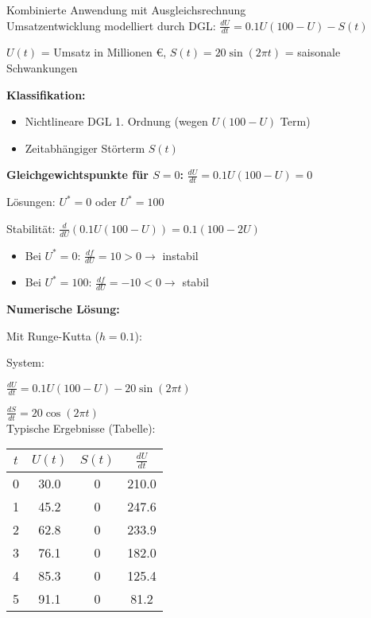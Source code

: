 \begin{example2}{Kombinierte Anwendung mit Ausgleichsrechnung}\\
Umsatzentwicklung modelliert durch DGL:
$\frac{dU}{dt} = 0.1U(100 - U) - S(t)$

$U(t)$ = Umsatz in Millionen €, $S(t) = 20\sin(2\pi t)$ = saisonale Schwankungen

\textbf{Klassifikation:}
\begin{itemize}
    \item Nichtlineare DGL 1. Ordnung (wegen $U(100-U)$ Term)
    \item Zeitabhängiger Störterm $S(t)$
\end{itemize}

\textbf{Gleichgewichtspunkte für $S = 0$:}
$\frac{dU}{dt} = 0.1U(100 - U) = 0$

Lösungen: $U^* = 0$ oder $U^* = 100$

Stabilität:
$\frac{d}{dU}(0.1U(100-U)) = 0.1(100 - 2U)$

\begin{itemize}
    \item Bei $U^* = 0$: $\frac{df}{dU} = 10 > 0 \rightarrow$ instabil
    \item Bei $U^* = 100$: $\frac{df}{dU} = -10 < 0 \rightarrow$ stabil
\end{itemize}

\begin{minipage}{0.59\linewidth}
\textbf{Numerische Lösung:}

Mit Runge-Kutta ($h = 0.1$):

System: 

$\frac{dU}{dt} = 0.1U(100-U) - 20\sin(2\pi t)$

$\frac{dS}{dt} = 20\cos(2\pi t)$
\vspace{2mm}\\
Typische Ergebnisse (Tabelle):
\end{minipage}
\begin{minipage}{0.4\linewidth}
\begin{center}
\begin{tabular}{|c|c|c|c|}
\hline
$t$ & $U(t)$ & $S(t)$ & $\frac{dU}{dt}$ \\
\hline
0 & 30.0 & 0 & 210.0 \\
1 & 45.2 & 0 & 247.6 \\
2 & 62.8 & 0 & 233.9 \\
3 & 76.1 & 0 & 182.0 \\
4 & 85.3 & 0 & 125.4 \\
5 & 91.1 & 0 & 81.2 \\
\hline
\end{tabular}
\end{center}
\end{minipage}


\end{example2}
